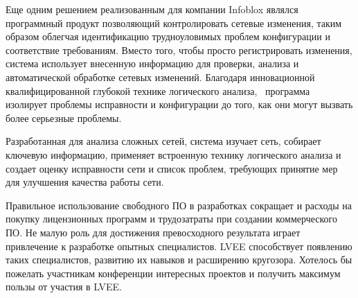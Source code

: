 \documentclass[10pt, a5paper]{article}
\begin{document}
Еще одним решением реализованным для компании Infoblox являлся программный продукт позволяющий контролировать сетевые изменения, таким образом облегчая идентификацию трудноуловимых проблем конфигурации и соответствие требованиям. Вместо того, чтобы просто регистрировать изменения, система использует внесенную информацию для проверки, анализа и автоматической обработке сетевых изменений. Благодаря инновационной квалифицированной глубокой технике логического анализа,  программа изолирует проблемы исправности и конфигурации до того, как они могут вызвать более серьезные проблемы. 

Разработанная для анализа сложных сетей, система изучает сеть, собирает ключевую информацию, применяет встроенную технику логического анализа и создает оценку исправности сети и список проблем, требующих принятие мер для улучшения качества работы сети.  

Правильное использование свободного ПО в разработках сокращает и расходы на покупку лицензионных программ и трудозатраты при создании коммерческого ПО. Не малую роль для достижения превосходного результата играет привлечение к разработке опытных специалистов. LVEE способствует появлению таких специалистов, развитию их навыков и расширению кругозора. Хотелось бы пожелать участникам конференции интересных проектов и получить максимум пользы от участия в LVEE.
\end{document}
